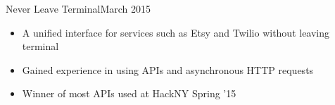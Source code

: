 \documentclass[11pt]{article}
\begin{document}

\headedsubsection
{Never Leave Terminal}{March 2015}
{
    \begin{itemize}[leftmargin=0.5in]
        \item{A unified interface for services such as Etsy and Twilio without leaving terminal}
        \item{Gained experience in using APIs and asynchronous HTTP requests}
        \item{Winner of most APIs used at HackNY Spring '15}
    \end{itemize}
}
\end{document}
